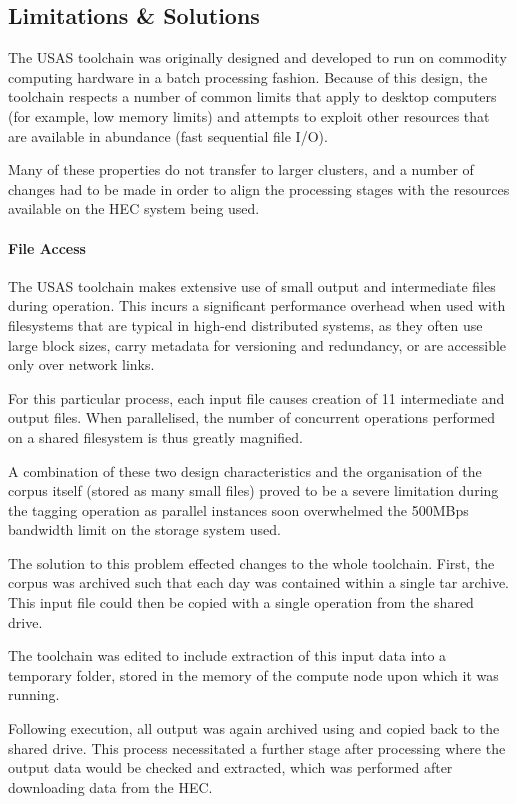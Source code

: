 \subsection{Limitations \& Solutions}
The USAS toolchain was originally designed and developed to run on commodity computing hardware in a batch processing fashion.  Because of this design, the toolchain respects a number of common limits that apply to desktop computers (for example, low memory limits) and attempts to exploit other resources that are available in abundance (fast sequential file I/O).

Many of these properties do not transfer to larger clusters, and a number of changes had to be made in order to align the processing stages with the resources available on the HEC system being used.


\paragraph{File Access}
The USAS toolchain makes extensive use of small output and intermediate files during operation.  This incurs a significant performance overhead when used with filesystems that are typical in high-end distributed systems, as they often use large block sizes, carry metadata for versioning and redundancy, or are accessible only over network links.

For this particular process, each input file causes creation of 11 intermediate and output files.  When parallelised, the number of concurrent operations performed on a shared filesystem is thus greatly magnified.

A combination of these two design characteristics and the organisation of the corpus itself (stored as many small files) proved to be a severe limitation during the tagging operation as parallel instances soon overwhelmed the 500MBps bandwidth limit on the storage system used.

The solution to this problem effected changes to the whole toolchain.  First, the corpus was archived such that each day was contained within a single tar archive.  This input file could then be copied with a single operation from the shared drive.

The toolchain was edited to include extraction of this input data into a temporary folder, stored in the memory of the compute node upon which it was running.

Following execution, all output was again archived using  and copied back to the shared drive.  This process necessitated a further stage after processing where the output data would be checked and extracted, which was performed after downloading data from the HEC.


